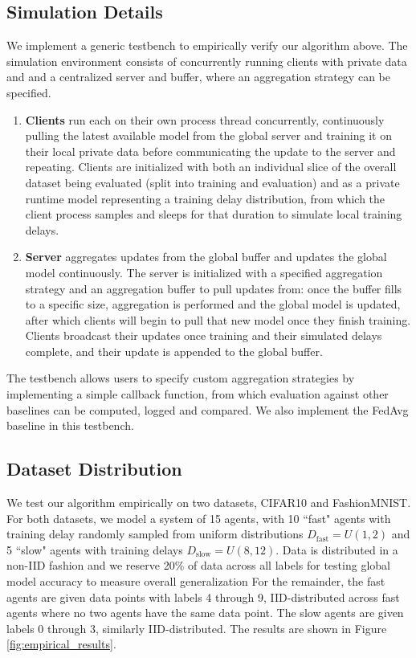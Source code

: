 \documentclass{article}
\begin{document}
\subsection{Simulation Details}
We implement a generic testbench to empirically verify our algorithm above. The simulation environment consists of concurrently running clients with private data and and a centralized server and buffer, where an aggregation strategy can be specified. 
\begin{enumerate}[leftmargin=2em]
    \item \textbf{Clients} run each on their own process thread concurrently, continuously pulling the latest available model from the global server and training it on their local private data before communicating the update to the server and repeating. Clients are initialized with both an individual slice of the overall dataset being evaluated (split into training and evaluation) and as a private runtime model representing a training delay distribution, from which the client process samples and sleeps for that duration to simulate local training delays.
    \item \textbf{Server} aggregates updates from the global buffer and updates the global model continuously. The server is initialized with a specified aggregation strategy and an aggregation buffer to pull updates from: once the buffer fills to a specific size, aggregation is performed and the global model is updated, after which clients will begin to pull that new model once they finish training. Clients broadcast their updates once training and their simulated delays complete, and their update is appended to the global buffer.
\end{enumerate}
The testbench allows users to specify custom aggregation strategies by implementing a simple callback function, from which evaluation against other baselines can be computed, logged and compared. We also implement the FedAvg baseline in this testbench.

\subsection{Dataset Distribution}

We test our algorithm empirically on two datasets, CIFAR10 and FashionMNIST. For both datasets, we model a system of 15 agents, with 10 ``fast" agents with training delay randomly sampled from uniform distributions $D_{\text{fast}} = U(1,2)$ and 5 ``slow" agents with training delays $D_{\text{slow}} = U(8,12)$. Data is distributed in a non-IID fashion and we reserve 20\% of data across all labels for testing global model accuracy to measure overall generalization For the remainder, the fast agents are given data points with labels 4 through 9, IID-distributed across fast agents where no two agents have the same data point. The slow agents are given labels 0 through 3, similarly IID-distributed. The results are shown in Figure \ref{fig:empirical_results}. 
\end{document}
